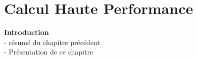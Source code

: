 \chapter{Calcul Haute Performance}\label{chap:hpc}
\minitoc

\textbf{Introduction}\\
- résumé du chapitre précédent\\
- Présentation de ce chapitre\\













\printbibliography[heading=references,segment=\therefsegment]
